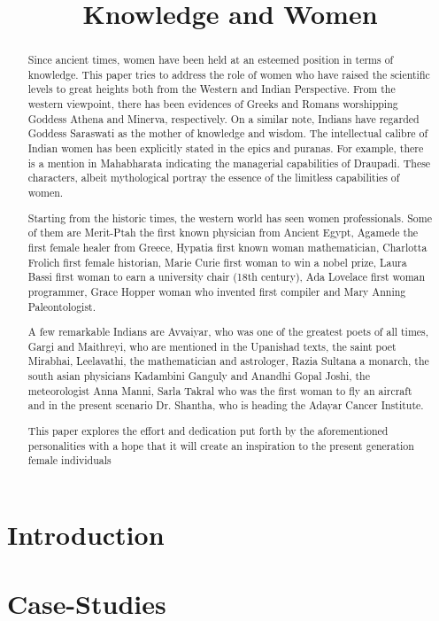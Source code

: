 \documentclass[a4paper,10pt]{article}
\title{Knowledge and Women}
\author{}
\begin{document}
\maketitle

\begin{abstract}
Since ancient times, women have been held at an esteemed position in terms of knowledge. This paper tries to address the role of women who have raised the scientific levels to great heights both from the Western and Indian Perspective. From the western viewpoint,  there has been evidences of Greeks and Romans worshipping Goddess Athena and Minerva, respectively. On a similar note, Indians have regarded Goddess Saraswati as the mother of knowledge and wisdom. The intellectual calibre of Indian women has been explicitly stated in the epics and puranas. For example, there is a mention in Mahabharata indicating the managerial capabilities of Draupadi. These characters, albeit mythological portray the essence of the limitless capabilities of women.

Starting from the historic times, the western world has seen women professionals. Some of them are Merit-Ptah the first known physician from Ancient Egypt, Agamede the first female healer from Greece, Hypatia first known woman mathematician, Charlotta Frolich first female historian,  Marie Curie first woman to win a nobel prize, Laura Bassi first woman to earn a university chair (18th century),  Ada Lovelace first woman programmer, Grace Hopper woman who invented first compiler and Mary Anning Paleontologist.

A few remarkable Indians are Avvaiyar, who was one of the greatest poets of all times,  Gargi and Maithreyi, who are mentioned in the Upanishad texts,  the saint poet Mirabhai, Leelavathi, the mathematician and astrologer, Razia Sultana a monarch, the south asian physicians Kadambini Ganguly and Anandhi Gopal Joshi, the meteorologist Anna Manni, Sarla Takral who was the first woman to fly an aircraft and in the present scenario Dr. Shantha, who is heading the Adayar Cancer Institute. 

This paper explores the effort and dedication put forth by the aforementioned personalities with a hope that it will create an inspiration to the present generation female individuals
\end{abstract}
\section{Introduction}
\section{Case-Studies}
\end{document}
